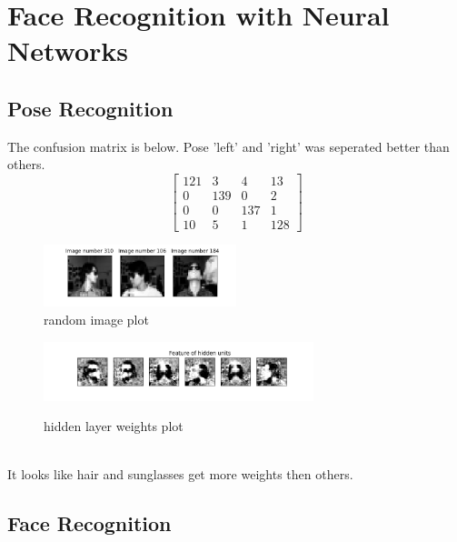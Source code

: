 \documentclass[a4paper]{article}
\begin{document}
\section{Face Recognition with Neural Networks}
\subsection{Pose Recognition}
The confusion matrix is below. Pose 'left' and 'right' was seperated better than others.\\
\[
\begin{bmatrix}
  121 & 3 & 4 & 13 \\
  0 & 139 & 0 & 2 \\
  0 & 0 & 137 & 1 \\
  10 & 5 & 1 & 128
\end{bmatrix}
\]
\begin{figure}[h]
  \begin{center}
  \includegraphics[width=0.5\textwidth]{ex_2_1_random.png}\\
  \caption{random image plot}
  \includegraphics[width=0.7\textwidth]{ex_2_1_hidden.png}\\
  \caption{hidden layer weights plot}
  \end{center}
\end{figure}\\
It looks like hair and sunglasses get more weights then others.
\subsection{Face Recognition}
\end{document}
